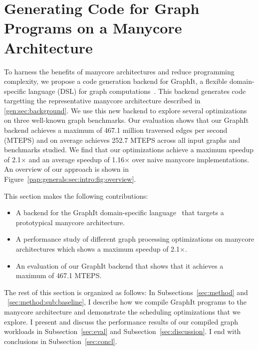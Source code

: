 \chapter{Generating Code for Graph Programs on a Manycore Architecture}\label{gen:sec:graphitbackend}

\introOverviewFigure

To harness the benefits of manycore architectures and reduce programming complexity, we propose a code generation backend for GraphIt, a flexible domain-specific language (DSL) for graph computations~\cite{zhang2018graphit}. 
This backend generates code targetting the representative manycore architecture described in \ref{gen:sec:background}.
We use this new backend to explore several optimizations on three well-known graph benchmarks.
Our evaluation shows that our GraphIt backend achieves a maximum of 467.1 million traversed edges per second (MTEPS) and on average achieves 252.7 MTEPS across all input graphs and benchmarks studied. 
We find that our optimizations achieve a maximum speedup of 2.1$\times$ and an average speedup of 1.16$\times$ over naive manycore implementations.
An overview of our approach is shown in Figure~\ref{pap:generals:sec:intro:fig:overview}.

This section makes the following contributions:
\begin{itemize}
    \item A backend for the GraphIt domain-specific language~\cite{zhang2018graphit} that targets a prototypical manycore architecture.
    \item A performance study of different graph processing optimizations on manycore architectures which shows a maximum speedup of 2.1$\times$.
    \item An evaluation of our GraphIt backend that shows that it achieves a maximum of 467.1 MTEPS.
\end{itemize}

The rest of this section is organized as follows:
In Subsections~\ref{sec:method} and ~\ref{sec:method:sub:baseline}, I describe how we compile GraphIt programs to the manycore architecture and demonstrate the scheduling optimizations that we explore.
I present and discuss the performance results of our compiled graph workloads in Subsection~\ref{sec:eval} and Subsection~\ref{sec:discussion}.
I end with conclusions in Subsection~\ref{sec:concl}.

%
%




